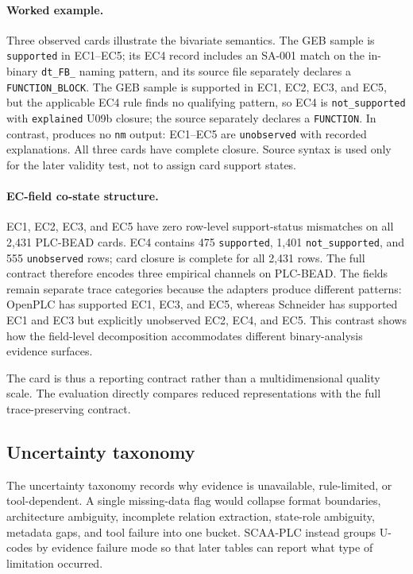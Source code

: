 \documentclass[a4paper,fleqn]{cas-dc}
\begin{document}
\paragraph{Worked example.} Three observed cards illustrate the bivariate semantics. The GEB sample  is \texttt{supported} in EC1--EC5; its EC4 record includes an SA-001 match on the in-binary \texttt{dt\_FB\_} naming pattern, and its source file separately declares a \texttt{FUNCTION\_BLOCK}. The GEB sample  is supported in EC1, EC2, EC3, and EC5, but the applicable EC4 rule finds no qualifying pattern, so EC4 is \texttt{not\_supported} with \texttt{explained} U09b closure; the source separately declares a \texttt{FUNCTION}. In contrast,  produces no \texttt{nm} output: EC1--EC5 are \texttt{unobserved} with recorded explanations. All three cards have complete closure. Source syntax is used only for the later validity test, not to assign card support states.

\paragraph{EC-field co-state structure.} EC1, EC2, EC3, and EC5 have zero row-level support-status mismatches on all 2{,}431 PLC-BEAD cards. EC4 contains 475 \texttt{supported}, 1{,}401 \texttt{not\_supported}, and 555 \texttt{unobserved} rows; card closure is complete for all 2{,}431 rows. The full contract therefore encodes three empirical channels on PLC-BEAD. The fields remain separate trace categories because the adapters produce different patterns: OpenPLC has supported EC1, EC3, and EC5, whereas Schneider has supported EC1 and EC3 but explicitly unobserved EC2, EC4, and EC5. This contrast shows how the field-level decomposition accommodates different binary-analysis evidence surfaces.

The card is thus a reporting contract rather than a multidimensional quality scale. The evaluation directly compares reduced representations with the full trace-preserving contract.

\subsection{Uncertainty taxonomy}

The uncertainty taxonomy records why evidence is unavailable, rule-limited, or tool-dependent. A single missing-data flag would collapse format boundaries, architecture ambiguity, incomplete relation extraction, state-role ambiguity, metadata gaps, and tool failure into one bucket. SCAA-PLC instead groups U-codes by evidence failure mode so that later tables can report what type of limitation occurred.
\end{document}
